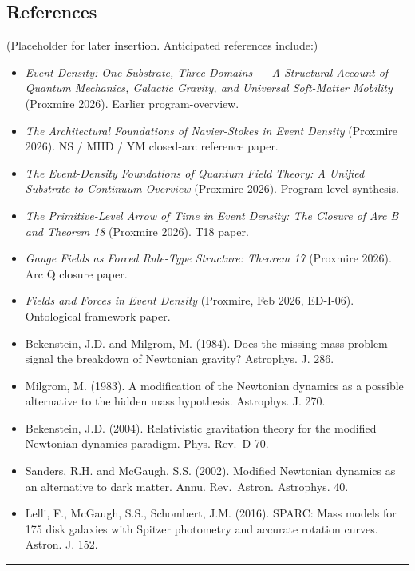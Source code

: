\documentclass[
]{article}
\providecommand{\tightlist}{%
  \setlength{\itemsep}{0pt}\setlength{\parskip}{0pt}}
\begin{document}
\subsection{References}\label{references}

(Placeholder for later insertion. Anticipated references include:)

\begin{itemize}
\tightlist
\item
  \emph{Event Density: One Substrate, Three Domains --- A Structural
  Account of Quantum Mechanics, Galactic Gravity, and Universal
  Soft-Matter Mobility} (Proxmire 2026). Earlier program-overview.
\item
  \emph{The Architectural Foundations of Navier-Stokes in Event Density}
  (Proxmire 2026). NS / MHD / YM closed-arc reference paper.
\item
  \emph{The Event-Density Foundations of Quantum Field Theory: A Unified
  Substrate-to-Continuum Overview} (Proxmire 2026). Program-level
  synthesis.
\item
  \emph{The Primitive-Level Arrow of Time in Event Density: The Closure
  of Arc B and Theorem 18} (Proxmire 2026). T18 paper.
\item
  \emph{Gauge Fields as Forced Rule-Type Structure: Theorem 17}
  (Proxmire 2026). Arc Q closure paper.
\item
  \emph{Fields and Forces in Event Density} (Proxmire, Feb 2026,
  ED-I-06). Ontological framework paper.
\item
  Bekenstein, J.D. and Milgrom, M. (1984). Does the missing mass problem
  signal the breakdown of Newtonian gravity? Astrophys. J. 286.
\item
  Milgrom, M. (1983). A modification of the Newtonian dynamics as a
  possible alternative to the hidden mass hypothesis. Astrophys. J. 270.
\item
  Bekenstein, J.D. (2004). Relativistic gravitation theory for the
  modified Newtonian dynamics paradigm. Phys. Rev.~D 70.
\item
  Sanders, R.H. and McGaugh, S.S. (2002). Modified Newtonian dynamics as
  an alternative to dark matter. Annu. Rev.~Astron. Astrophys. 40.
\item
  Lelli, F., McGaugh, S.S., Schombert, J.M. (2016). SPARC: Mass models
  for 175 disk galaxies with Spitzer photometry and accurate rotation
  curves. Astron. J. 152.
\end{itemize}

\begin{center}\rule{0.5\linewidth}{0.5pt}\end{center}
\end{document}
